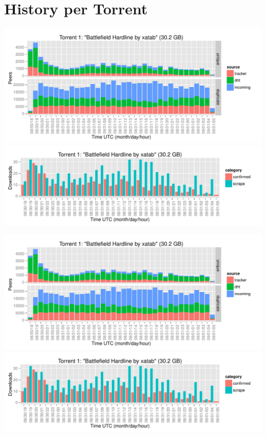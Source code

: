 \documentclass[10pt, a4paper, twoside=false, headsepline]{scrbook}
\renewcommand{\_}{\origunderscore\allowbreak}
\begin{document}
\appendix
\chapter{History per Torrent}
\ohead{\rightmark}

\begin{minipage}{\textwidth}
\includegraphics[width=\textwidth, page=\value{TorrentPage}]{../result/2015-08-30_20-combined_source_per_torrent}
\includegraphics[width=\textwidth, page=\value{TorrentPage}]{../result/2015-08-30_20-combined_download_each}
\end{minipage}

\begin{minipage}{\textwidth}
\includegraphics[width=\textwidth, page=\value{TorrentPage}]{../result/2015-08-30_20-combined_source_per_torrent}
\includegraphics[width=\textwidth, page=\value{TorrentPage}]{../result/2015-08-30_20-combined_download_each}
\end{minipage}
\end{document}
